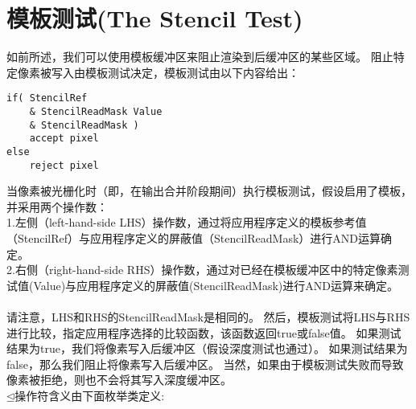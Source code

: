 \section{模板测试(The Stencil Test)}
\begin{flushleft}
如前所述，我们可以使用模板缓冲区来阻止渲染到后缓冲区的某些区域。 阻止特定像素被写入由模板测试决定，模板测试由以下内容给出：\\
\end{flushleft}

\begin{lstlisting}
if( StencilRef 
    & StencilReadMask Value 
    & StencilReadMask )
    accept pixel
else
    reject pixel
\end{lstlisting}

\begin{flushleft}
当像素被光栅化时（即，在输出合并阶段期间）执行模板测试，假设启用了模板，并采用两个操作数：\\

1.左侧（left-hand-side LHS）操作数，通过将应用程序定义的模板参考值（StencilRef）与应用程序定义的屏蔽值（StencilReadMask）进行AND运算确定。\\

2.右侧（right-hand-side RHS）操作数，通过对已经在模板缓冲区中的特定像素测试值(Value)与应用程序定义的屏蔽值(StencilReadMask)进行AND运算来确定。\\
~\\
请注意，LHS和RHS的StencilReadMask是相同的。 然后，模板测试将LHS与RHS进行比较，指定应用程序选择的比较函数，该函数返回true或false值。 如果测试结果为true，我们将像素写入后缓冲区（假设深度测试也通过）。 如果测试结果为false，那么我们阻止将像素写入后缓冲区。 当然，如果由于模板测试失败而导致像素被拒绝，则也不会将其写入深度缓冲区。\\

$\unlhd$操作符含义由下面枚举类定义:\\
\end{flushleft}

